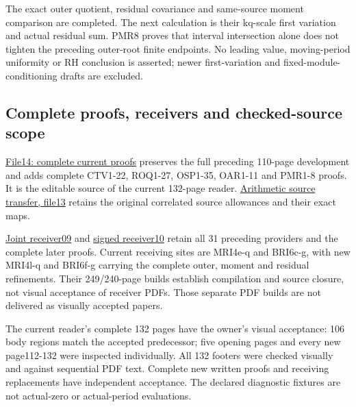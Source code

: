 \documentclass[
]{article}
\begin{document}
The exact outer quotient, residual covariance and same-source moment
comparison are completed. The next calculation is their kq-scale first
variation and actual residual sum. PMR8 proves that interval
intersection alone does not tighten the preceding outer-root finite
endpoints. No leading value, moving-period uniformity or RH conclusion
is asserted; newer first-variation and fixed-module-conditioning drafts
are excluded.

\subsection{Complete proofs, receivers and checked-source
scope}\label{complete-proofs-receivers-and-checked-source-scope}

\href{https://github.com/KokunoYumeto/zeta-function-research-reader/blob/bf39bac055b76ce755b91401b35570bb84d76d9a/workbenches/splitzero-tandem/continuations/20260915-quotient-moment-continuation/14_CURRENT_KERNEL_AND_MULTIPLICITY_PROOFS.tex}{File14:
complete current proofs} preserves the full preceding 110-page
development and adds complete CTV1-22, ROQ1-27, OSP1-35, OAR1-11 and
PMR1-8 proofs. It is the editable source of the current 132-page reader.
\href{https://github.com/KokunoYumeto/zeta-function-research-reader/blob/bf39bac055b76ce755b91401b35570bb84d76d9a/workbenches/splitzero-tandem/continuations/20260915-quotient-moment-continuation/13_ARITHMETIC_MIXED_TRANSFER.tex}{Arithmetic
source transfer, file13} retains the original correlated source
allowances and their exact maps.

\href{https://github.com/KokunoYumeto/zeta-function-research-reader/blob/bf39bac055b76ce755b91401b35570bb84d76d9a/workbenches/splitzero-tandem/continuations/20260915-quotient-moment-continuation/09_UPDATED_JOINT_NOTE.tex}{Joint
receiver09} and
\href{https://github.com/KokunoYumeto/zeta-function-research-reader/blob/bf39bac055b76ce755b91401b35570bb84d76d9a/workbenches/splitzero-tandem/continuations/20260915-quotient-moment-continuation/10_UPDATED_SIGNED_RETURN.tex}{signed
receiver10} retain all 31 preceding providers and the complete later
proofs. Current receiving sites are MRI4e-q and BRI6c-g, with new
MRI4l-q and BRI6f-g carrying the complete outer, moment and residual
refinements. Their 249/240-page builds establish compilation and source
closure, not visual acceptance of receiver PDFs. Those separate PDF
builds are not delivered as visually accepted papers.

The current reader's complete 132 pages have the owner's visual
acceptance: 106 body regions match the accepted predecessor; five
opening pages and every new page112-132 were inspected individually. All
132 footers were checked visually and against sequential PDF text.
Complete new written proofs and receiving replacements have independent
acceptance. The declared diagnostic fixtures are not actual-zero or
actual-period evaluations.
\end{document}
